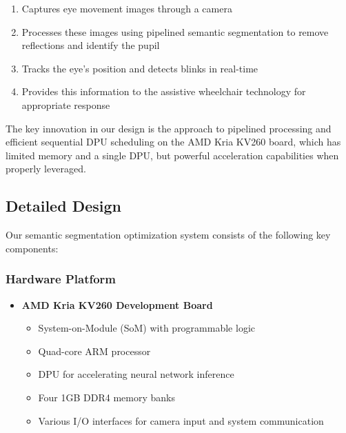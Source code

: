 \begin{enumerate}
\item Captures eye movement images through a camera
\item Processes these images using pipelined semantic segmentation to remove reflections and identify the pupil
\item Tracks the eye's position and detects blinks in real-time
\item Provides this information to the assistive wheelchair technology for appropriate response
\end{enumerate}

The key innovation in our design is the approach to pipelined processing and efficient sequential DPU scheduling on the AMD Kria KV260 board, which has limited memory and a single DPU, but powerful acceleration capabilities when properly leveraged.

\subsection{Detailed Design}\label{subsec:detailed-design}

Our semantic segmentation optimization system consists of the following key components:

\subsubsection{Hardware Platform}
\begin{itemize}
\item \textbf{AMD Kria KV260 Development Board}~\cite{xilinx2022kv260}
  \begin{itemize}
  \item System-on-Module (SoM) with programmable logic
  \item Quad-core ARM processor
  \item DPU for accelerating neural network inference
  \item Four 1GB DDR4 memory banks
  \item Various I/O interfaces for camera input and system communication
  \end{itemize}
\end{itemize}

